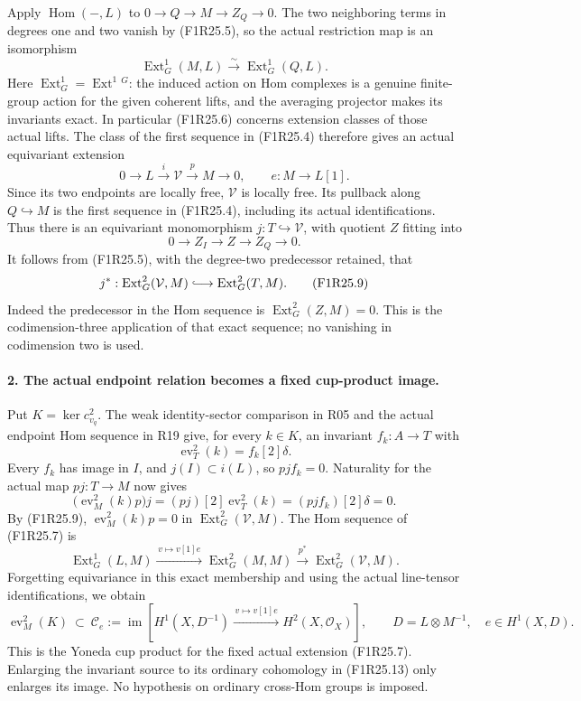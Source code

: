 Apply $\operatorname{Hom}(-,L)$ to
$0\to Q\to M\to Z_Q\to0$. The two neighboring
terms in degrees one and two vanish by (F1R25.5),
so the actual restriction map is an isomorphism
\[
 \operatorname{Ext}^1_G(M,L)
          \xrightarrow{\ \sim\ }\operatorname{Ext}^1_G(Q,L).
 \tag{F1R25.6}
\]
Here $\operatorname{Ext}^1_G=\operatorname{Ext}^1{}^G$:
the induced action on Hom complexes is a genuine
finite-group action for the given coherent lifts,
and the averaging projector makes its invariants
exact. In particular (F1R25.6) concerns extension
classes of those actual lifts. The class of the
first sequence in (F1R25.4) therefore gives an
actual equivariant extension
\[
 0\longrightarrow L\xrightarrow{i}\mathcal V
                 \xrightarrow{p}M\longrightarrow0,
       \qquad e:M\longrightarrow L[1].
 \tag{F1R25.7}
\]
Since its two endpoints are locally free,
$\mathcal V$ is locally free. Its pullback along
$Q\hookrightarrow M$ is the first sequence in
(F1R25.4), including its actual identifications.
Thus there is an equivariant monomorphism
$j:T\hookrightarrow\mathcal V$, with quotient $Z$
fitting into
\[
                 0\longrightarrow Z_I\longrightarrow Z
                          \longrightarrow Z_Q\longrightarrow0.
 \tag{F1R25.8}
\]
It follows from (F1R25.5), with the degree-two
predecessor retained, that
\[
 j^*:\operatorname{Ext}^2_G(\mathcal V,M)
                 \lhook\joinrel\longrightarrow
                     \operatorname{Ext}^2_G(T,M).
 \tag{F1R25.9}
\]
Indeed the predecessor in the Hom sequence is
$\operatorname{Ext}^2_G(Z,M)=0$. This is the
codimension-three application of that exact
sequence; no vanishing in codimension two is used.

\paragraph{2. The actual endpoint relation becomes a fixed cup-product image.}
Put $K=\ker c^2_{v_q}$. The weak identity-sector
comparison in R05 and the actual endpoint Hom
sequence in R19 give, for every $k\in K$, an
invariant $f_k:A\to T$ with
\[
                    \operatorname{ev}_T^2(k)=f_k[2]\delta.
 \tag{F1R25.10}
\]
Every $f_k$ has image in $I$, and $j(I)\subset i(L)$,
so $p j f_k=0$. Naturality for the actual map
$p j:T\to M$ now gives
\[
 \bigl(\operatorname{ev}_M^2(k)p\bigr)j
       =(p j)[2]\operatorname{ev}_T^2(k)
       =(p j f_k)[2]\delta=0.
 \tag{F1R25.11}
\]
By (F1R25.9), $\operatorname{ev}_M^2(k)p=0$ in
$\operatorname{Ext}^2_G(\mathcal V,M)$.
The Hom sequence of (F1R25.7) is
\[
 \operatorname{Ext}^1_G(L,M)
   \xrightarrow{\,v\mapsto v[1]e\,}
 \operatorname{Ext}^2_G(M,M)
   \xrightarrow{\,p^*\,}
 \operatorname{Ext}^2_G(\mathcal V,M).
 \tag{F1R25.12}
\]
Forgetting equivariance in this exact membership
and using the actual line-tensor identifications,
we obtain
\[
 \operatorname{ev}_M^2(K)\ \subset\
 \mathcal C_e:=
 \operatorname{im}\left[
       H^1(X,D^{-1})\xrightarrow{\,v\mapsto v[1]e\,}
       H^2(X,\mathcal O_X)\right],
 \qquad
 D=L\otimes M^{-1},\quad e\in H^1(X,D).
 \tag{F1R25.13}
\]
This is the Yoneda cup product for the fixed actual
extension (F1R25.7). Enlarging the invariant source
to its ordinary cohomology in (F1R25.13) only
enlarges its image. No hypothesis on ordinary
cross-Hom groups is imposed.

